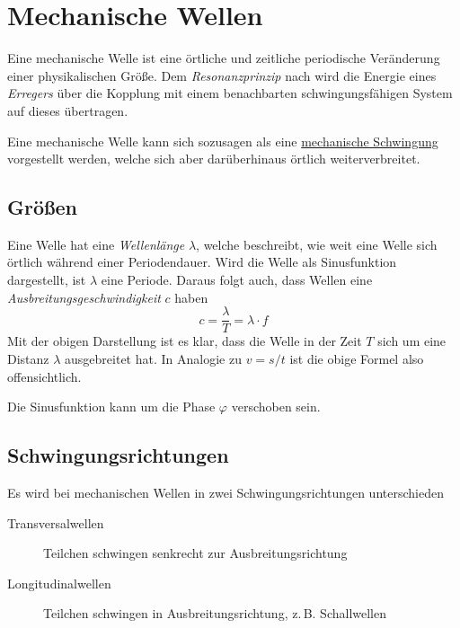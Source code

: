 \documentclass{article}
\begin{document}
\section{Mechanische Wellen} 
Eine mechanische Welle ist eine örtliche und zeitliche periodische Veränderung einer physikalischen Größe. Dem \emph{Resonanzprinzip} nach wird die Energie eines \emph{Erregers} über die Kopplung mit einem benachbarten schwingungsfähigen System auf dieses übertragen.
 
Eine mechanische Welle kann sich sozusagen als eine \hyperref[Mechanische Schwingungen]{mechanische Schwingung} vorgestellt werden, welche sich aber darüberhinaus örtlich weiterverbreitet.
\begin{center} 
\end{center}
 
\subsection{Größen} 
Eine Welle hat eine \emph{Wellenlänge} $\lambda$, welche beschreibt, wie weit eine Welle sich örtlich während einer Periodendauer. Wird die Welle als Sinusfunktion dargestellt, ist $\lambda$ eine Periode. Daraus folgt auch, dass Wellen eine \emph{Ausbreitungsgeschwindigkeit} $c$ haben
\[
 c = \frac{\lambda}{T} = \lambda \cdot f 
\]
Mit der obigen Darstellung ist es klar, dass die Welle in der Zeit $T$ sich um eine Distanz $\lambda$ ausgebreitet hat. In Analogie zu $v=s/t$ ist die obige Formel also offensichtlich. 
 
Die Sinusfunktion kann um die Phase $\varphi$ verschoben sein. 
 
\subsection{Schwingungsrichtungen} 
Es wird bei mechanischen Wellen in zwei Schwingungsrichtungen unterschieden
\begin{description}
 \item[Transversalwellen] Teilchen schwingen senkrecht zur Ausbreitungsrichtung
 \item[Longitudinalwellen] Teilchen schwingen in Ausbreitungsrichtung, z.\,B. Schallwellen
\end{description} 
\end{document}
